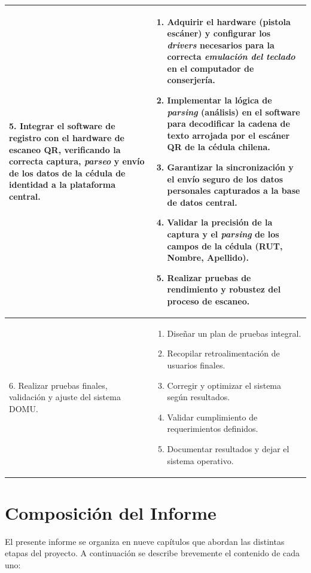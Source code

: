 \begin{longtable}{|p{}|p{}|}
5. Integrar el software de registro con el hardware de escaneo QR, verificando la correcta captura, \textit{parseo} y envío de los datos de la cédula de identidad a la plataforma central. &
\begin{enumerate}
    \item Adquirir el hardware (pistola escáner) y configurar los \textit{drivers} necesarios para la correcta \textit{emulación del teclado} en el computador de conserjería.
    \item Implementar la lógica de \textit{parsing} (análisis) en el software para decodificar la cadena de texto arrojada por el escáner QR de la cédula chilena.
    \item Garantizar la sincronización y el envío seguro de los datos personales capturados a la base de datos central.
    \item Validar la precisión de la captura y el \textit{parsing} de los campos de la cédula (RUT, Nombre, Apellido).
    \item Realizar pruebas de rendimiento y robustez del proceso de escaneo.
\end{enumerate}
\\ \hline

6. Realizar pruebas finales, validación y ajuste del sistema DOMU. &
\begin{enumerate}
    \item Diseñar un plan de pruebas integral.
    \item Recopilar retroalimentación de usuarios finales.
    \item Corregir y optimizar el sistema según resultados.
    \item Validar cumplimiento de requerimientos definidos.
    \item Documentar resultados y dejar el sistema operativo.
\end{enumerate}
\\ \hline

\end{longtable}

\section{Composición del Informe}
El presente informe se organiza en nueve capítulos que abordan las distintas etapas del proyecto. A continuación se describe brevemente el contenido de cada uno:

